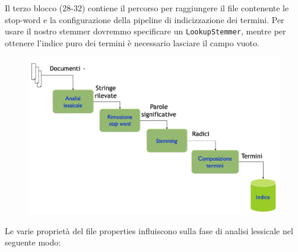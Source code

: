 Il terzo blocco (28-32) contiene il percorso per raggiungere il file contenente le stop-word e la configurazione della pipeline di indicizzazione dei termini.
Per usare il nostro stemmer dovremmo specificare un \texttt{LookupStemmer}, mentre per ottenere l'indice puro dei termini è necessario lasciare il campo vuoto.

\begin{figure}[htbp]
	\centering
	\includegraphics[width=0.7\linewidth]{images/l12-fig-3.png}
\end{figure}

\noindent Le varie proprietà del file properties influiscono sulla fase di analisi lessicale nel seguente modo:

